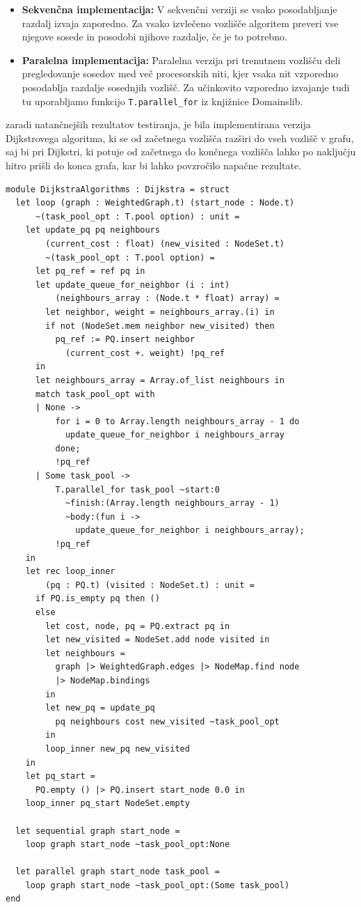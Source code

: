 \documentclass[mat1, tisk]{fmfdelo}
\begin{document}
\begin{itemize}
  \item \textbf{Sekvenčna implementacija: } V sekvenčni verziji se vsako posodabljanje razdalj izvaja zaporedno.
    Za vsako izvlečeno vozlišče algoritem preveri vse njegove sosede in posodobi njihove razdalje, če je to potrebno.
  \item \textbf{Paralelna implementacija: } Paralelna verzija pri trenutnem vozlišču deli pregledovanje sosedov med
    več procesorskih niti, kjer vsaka nit vzporedno posodablja razdalje sosednjih vozlišč. Za učinkovito vzporedno
    izvajanje tudi tu uporabljamo funkcijo \texttt{T.parallel\_for} iz knjižnice Domainslib.
\end{itemize}

zaradi natančnejših rezultatov testiranja, je bila implementirana verzija Dijkstrovega algoritma, ki se od začetnega vozlišča
razširi do vseh vozlišč v grafu, saj bi pri Dijkstri, ki potuje od začetnega do končnega vozlišča lahko po naključju
hitro prišli do konca grafa, kar bi lahko povzročilo napačne rezultate.

\begin{lstlisting}
module DijkstraAlgorithms : Dijkstra = struct
  let loop (graph : WeightedGraph.t) (start_node : Node.t)
      ~(task_pool_opt : T.pool option) : unit =
    let update_pq pq neighbours
        (current_cost : float) (new_visited : NodeSet.t)
        ~(task_pool_opt : T.pool option) =
      let pq_ref = ref pq in
      let update_queue_for_neighbor (i : int)
          (neighbours_array : (Node.t * float) array) =
        let neighbor, weight = neighbours_array.(i) in
        if not (NodeSet.mem neighbor new_visited) then
          pq_ref := PQ.insert neighbor 
            (current_cost +. weight) !pq_ref
      in
      let neighbours_array = Array.of_list neighbours in
      match task_pool_opt with
      | None ->
          for i = 0 to Array.length neighbours_array - 1 do
            update_queue_for_neighbor i neighbours_array
          done;
          !pq_ref
      | Some task_pool ->
          T.parallel_for task_pool ~start:0
            ~finish:(Array.length neighbours_array - 1)
            ~body:(fun i -> 
              update_queue_for_neighbor i neighbours_array);
          !pq_ref
    in
    let rec loop_inner 
        (pq : PQ.t) (visited : NodeSet.t) : unit =
      if PQ.is_empty pq then ()
      else
        let cost, node, pq = PQ.extract pq in
        let new_visited = NodeSet.add node visited in
        let neighbours =
          graph |> WeightedGraph.edges |> NodeMap.find node
          |> NodeMap.bindings
        in
        let new_pq = update_pq 
          pq neighbours cost new_visited ~task_pool_opt
        in
        loop_inner new_pq new_visited
    in
    let pq_start = 
      PQ.empty () |> PQ.insert start_node 0.0 in
    loop_inner pq_start NodeSet.empty

  let sequential graph start_node =
    loop graph start_node ~task_pool_opt:None

  let parallel graph start_node task_pool =
    loop graph start_node ~task_pool_opt:(Some task_pool)
end
\end{lstlisting}
\end{document}
